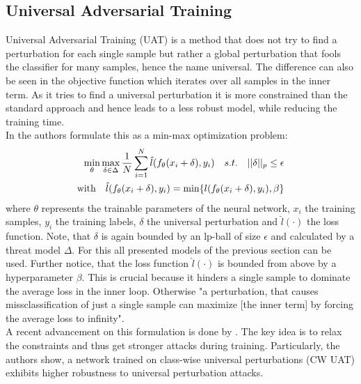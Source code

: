 \documentclass{article}
\begin{document}
\subsection{Universal Adversarial Training}
Universal Adversarial Training (UAT) is a method that does not try to find a perturbation for each single sample but rather a global perturbation that fools the classifier for many samples, hence the name universal. The difference can also be seen in the objective function which iterates over all samples in the inner term. As it tries to find a universal perturbation it is more constrained than the standard approach and hence leads to a less robust model, while reducing the training time. \\
In \cite{b4} the authors formulate this as a min-max optimization problem:
\begingroup
\setlength\abovedisplayskip{0pt}
\setlength\belowdisplayskip{6pt}
\begin{align}
  \label{eqn:universal}
  \min_{\theta} \max_{\delta \in \Delta} \space \frac{1}{N} \sum_{i=1}^N \space \hat{l}(f_{\theta}(x_i + \delta), y_i) \quad s.t. \quad ||\delta||_p \leq \epsilon \\
  \text{with} \quad \hat{l}(f_{\theta}(x_i + \delta), y_i) = \min \{l(f_{\theta}(x_i + \delta), y_i), \beta \}
\end{align}
\endgroup
where $\theta$ represents the trainable parameters of the neural network, $x_i$ the training samples, $y_i$ the training labels, $\delta$ the universal perturbation and $\hat{l}(\cdot)$ the loss function. Note, that $\delta$ is again bounded by an lp-ball of size $\epsilon$ and calculated by a threat model $\Delta$. For this all presented models of the previous section can be used. Further notice, that the loss function $\hat{l}(\cdot)$ is bounded from above by a hyperparameter $\beta$. This is crucial because it hinders a single sample to dominate the average loss in the inner loop. Otherwise "a perturbation, that causes missclassification of just a single sample can maximize [the inner term] by forcing the average loss to infinity"\cite{b4}. \\
A recent advancement on this formulation is done by \cite{b11}. The key idea is to relax the constraints and thus get stronger attacks during training. Particularly, the authors show, a network trained on class-wise universal perturbations (CW UAT) exhibits higher robustness to universal perturbation attacks.
  
\end{document}
